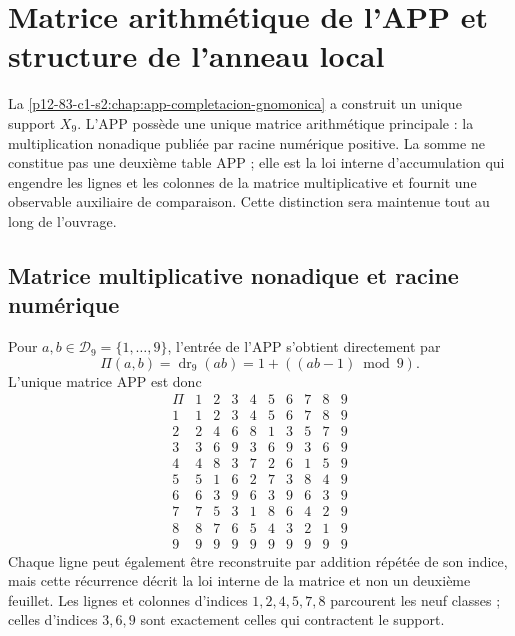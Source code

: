 \label{chap:83-01}

\begingroup
\def\HMTAPPFormal{1}
\def\HMTAPPDevelopments{1}
\begin{HMTScientificOwnerSubordinated}

\end{HMTScientificOwnerSubordinated}
\endgroup


\section{Matrice arithmétique de l’APP et structure de l’anneau local}
\label{p12-83-c1-s1:chap:app-hojas-algebra-local}

La \cref{p12-83-c1-s2:chap:app-completacion-gnomonica} a construit un unique support
\(X_9\). L’APP possède une unique matrice arithmétique principale : la multiplication
nonadique publiée par racine numérique positive. La somme ne constitue pas une
deuxième table APP ; elle est la loi interne d’accumulation qui engendre les lignes et
les colonnes de la matrice multiplicative et fournit une observable auxiliaire de
comparaison. Cette distinction sera maintenue tout au long de l’ouvrage.

\subsection{Matrice multiplicative nonadique et racine numérique}

Pour \(a,b\in\mathcal D_9=\{1,\ldots,9\}\), l’entrée de l’APP s’obtient
directement par
\begin{equation}
 \boxed{\Pi(a,b)=\operatorname{dr}_9(ab)
 =1+((ab-1)\bmod9).}
 \label{p12-83-c1-s1:eq:app-matriz-multiplicativa-directa}
\end{equation}
L’unique matrice APP est donc
\[
\begin{array}{c|ccccccccc}
\Pi&1&2&3&4&5&6&7&8&9\\\hline
1&1&2&3&4&5&6&7&8&9\\
2&2&4&6&8&1&3&5&7&9\\
3&3&6&9&3&6&9&3&6&9\\
4&4&8&3&7&2&6&1&5&9\\
5&5&1&6&2&7&3&8&4&9\\
6&6&3&9&6&3&9&6&3&9\\
7&7&5&3&1&8&6&4&2&9\\
8&8&7&6&5&4&3&2&1&9\\
9&9&9&9&9&9&9&9&9&9
\end{array}
\]
Chaque ligne peut également être reconstruite par addition répétée de son indice,
mais cette récurrence décrit la loi interne de la matrice et non un deuxième
feuillet. Les lignes et colonnes d’indices \(1,2,4,5,7,8\) parcourent les neuf
classes ; celles d’indices \(3,6,9\) sont exactement celles qui contractent le support.

